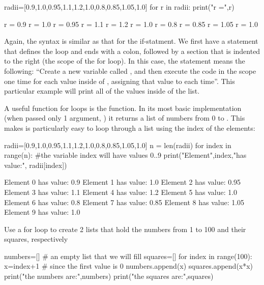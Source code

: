\begin{python}[caption = \mbox{}]
radii=[0.9,1.0,0.95,1.1,1.2,1.0,0.8,0.85,1.05,1.0]
for r in radii:
  print("r =",r)
\end{python}
\begin{poutput}
r = 0.9
r = 1.0
r = 0.95
r = 1.1
r = 1.2
r = 1.0
r = 0.8
r = 0.85
r = 1.05
r = 1.0
\end{poutput}

Again, the syntax is similar as that for the if-statment. We first have a statement that defines the loop and ends with a colon, followed by a section that is indented to the right (the scope of the for loop). In this case, the  statement means the following: ``Create a new variable called , and then execute the code in the scope one time for each value inside of , assigning that value to  each time''. This particular example will print all of the values inside of the list.

A useful function for loops is the  function. In its most basic implementation (when passed only 1 argument, ) it returns a list of numbers from 0 to . This makes is particularly easy to loop through a list using the index of the elements:

\begin{python}[caption = \mbox{}]
radii=[0.9,1.0,0.95,1.1,1.2,1.0,0.8,0.85,1.05,1.0]
n = len(radii)
for index in range(n):
  #the variable index will have values 0..9
  print("Element",index,"has value:", radii[index])
\end{python}
\begin{poutput}
Element 0 has value: 0.9
Element 1 has value: 1.0
Element 2 has value: 0.95
Element 3 has value: 1.1
Element 4 has value: 1.2
Element 5 has value: 1.0
Element 6 has value: 0.8
Element 7 has value: 0.85
Element 8 has value: 1.05
Element 9 has value: 1.0
\end{poutput}

\begin{example}{Use a for loop to create 2 lists that hold the numbers from 1 to 100 and their squares, respectively}{}
\begin{python}[caption = \mbox{}]
numbers=[] # an empty list that we will fill
squares=[]
for index in range(100):
  x=index+1 # since the first value is 0
  numbers.append(x)
  squares.append(x*x)
print("the numbers are:",numbers)
print("the squares are:",squares)
\end{python}
\end{example}
